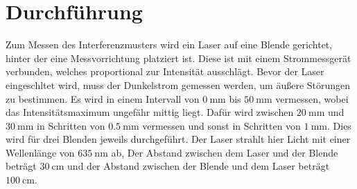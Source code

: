 \section{Durchführung}
Zum Messen des Interferenzmusters wird ein Laser auf eine Blende gerichtet, hinter der
eine Messvorrichtung platziert ist. Diese ist mit einem Strommessgerät verbunden, welches proportional zur Intensität
ausschlägt. Bevor der Laser eingeschltet wird, muss der Dunkelstrom gemessen werden, um äußere Störungen zu bestimmen.
Es wird in einem Intervall von $\qty{0}{\milli\meter}$ bis $\qty{50}{\milli\meter}$ vermessen, wobei das 
Intensitätsmaximum ungefähr mittig liegt. Dafür wird zwischen $\qty{20}{\milli\meter}$ und $\qty{30}{\milli\meter}$ in
Schritten von $\qty{0.5}{\milli\meter}$ vermessen und sonst in Schritten von $\qty{1}{\milli\meter}$. Dies wird für 
drei Blenden jeweils durchgeführt. Der Laser strahlt hier Licht mit einer Wellenlänge von $\qty{635}{\nano\meter}$ ab, 
Der Abstand zwischen dem Laser und der Blende beträgt $\qty{30}{\centi\meter}$ und der Abstand zwischen der Blende und dem
Laser beträgt $\qty{100}{\centi\meter}$.
\label{sec:Durchführung}
